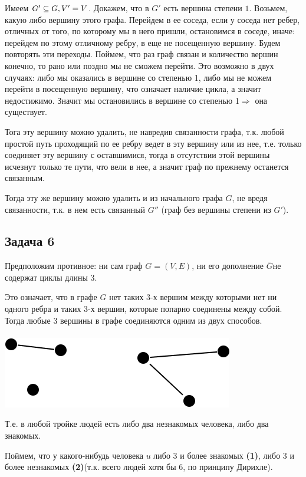\documentclass{article}
\begin{document}
Имеем $ G' \subseteq G,\space V' = V $. 
Докажем, что в $ G' $ есть вершина степени $ 1 $.
Возьмем, какую либо вершину этого графа. Перейдем в ее соседа, если у соседа нет ребер, отличных от того, по которому мы в него пришли, остановимся в соседе, иначе: перейдем по этому отличному ребру, в еще не посещенную вершину. Будем повторять эти переходы. Поймем, что раз граф связан и количество вершин конечно, то рано или поздно мы не сможем перейти. Это возможно в двух случаях: либо мы оказались в вершине со степенью 1, либо мы не можем перейти в посещенную вершину, что означает наличие цикла, а значит недостижимо. Значит мы остановились в вершине со степенью 1$\Rightarrow$ она существует.

Тога эту вершину можно удалить, не навредив связанности графа, т.к. любой простой путь проходящий по ее ребру ведет в эту вершину или из нее, т.е. только соединяет эту вершину с оставшимися, тогда в отсутствии этой вершины исчезнут только те пути, что вели в нее, а значит граф по прежнему останется связанным.

Тогда эту же вершину можно удалить и из начального графа $G$, не вредя связанности, т.к. в нем есть связанный $G''$ (граф без вершины степени из $G'$). 
\begin{center}
	\subsection*{Задача 6}
\end{center}
Предположим противное: ни сам граф $ G = (V, E) $, ни его дополнение $ \bar{G} $не содержат циклы длины $ 3 $.

Это означает, что в графе $ G $ нет таких 3-х вершим между которыми нет ни одного ребра и таких 3-х вершин, которые попарно соединены между собой.
Тогда любые 3 вершины в графе соединяются одним из двух способов.
\\
\\

\includegraphics[scale=0.5]{6_1.png} 


Т.е. в любой тройке людей есть либо два незнакомых человека, либо два знакомых. 

Поймем, что у какого-нибудь человека $u$ либо 3 и более знакомых \textbf{(1)}, либо 3 и более незнакомых \textbf{(2)}(т.к. всего людей хотя бы 6, по принципу Дирихле).
\end{document}
